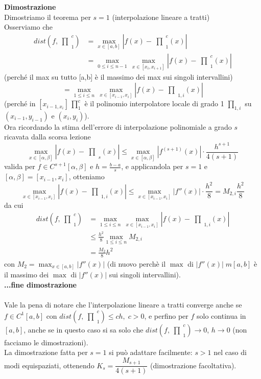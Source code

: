 \documentclass[12pt,a4paper]{article}
\newcommand{\inter}{\begin{matrix}\prod\end{matrix}}
\begin{document}
\textbf{Dimostrazione}\\
Dimostriamo il teorema per $s=1$ (interpolazione lineare a tratti)\\
Osserviamo che
\[ \begin{split}
    dist(f, \inter_{1}^{c}) & = \max_{x \in [a,b]} |f(x) - \inter_{1}^{c} (x) | \\
    & = \max_{0 \le i \le n-1}\, \max_{x \in [x_i, x_{i+1}]} |f(x) - \inter_{1}^{c} (x) |
\end{split} \]
(perché il max su tutto [a,b] è il massimo dei max sui singoli intervallini)
\[= \max_{1 \le i \le n}\, \max_{x \in [x_{i-1},x_i]} |f(x) - \inter_{1,i}^{}(x)|\]
(perché in $[x_{i-1, x_i}] \,\prod_1^c$ è il polinomio interpolatore locale di grado 1 $\prod_{1,i}$ su $(x_{i-1}, y_{i-1})$ e $(x_i, y_i)$).\\
Ora ricordando la stima dell'errore di interpolazione polinomiale a grado $s$ ricavata dalla scorsa lezione
\[\max_{x\in [\alpha , \beta]}|f(x) - \inter_{s}^{}(x)| \le \max_{x\in [\alpha , \beta]}|f^{(s+1)}(x)|\cdot\frac{h^{s+1}}{4(s+1)} \]
valida per $f \in C^{s+1}[\alpha, \beta]$ e $h = \frac{b-a}{s}$, e applicandola per $s=1$ e $[\alpha,\beta] = [x_{i-1},x_i]$, otteniamo
\[\max_{x\in [x_{i-1},x_i]}|f(x) - \inter_{1,i}^{}(x)| \le \max_{x\in [x_{i-1},x_i]}|f''(x)|\cdot\frac{h^2}{8} = M_{2,i} \frac{h^2}{8} \]
da cui
\[ \begin{split}
    dist(f, \inter_{1}^{c}) & = \max_{1 \le i \le n}\, \max_{x \in [x_{i-1},x_i]} |f(x) - \inter_{1,i}^{}(x)| \\
    & \le \frac{h^2}{8} \max_{1 \le i \le n} M_{2,i} \\
    & = \frac{M_2}{8}h^2
\end{split} \]
con $M_2 = \max_{x\in[a,b]} |f''(x)|$ (di nuovo perchè il $\max$ di $|f''(x)| \; m[a,b]$ è il massimo dei $\max$ di $|f''(x)|$ sui singoli intervallini).\\
\textbf{...fine dimostrazione}\\\\
Vale la pena di notare che l'interpolazione lineare a tratti converge anche se $f \in C^1[a,b]$ con $dist(f,\inter_1^c)\leq ch, \; c>0$, e perfino per $f$ solo continua in $[a,b]$, anche se in questo caso si sa solo che $dist(f,\inter_1^c) \rightarrow 0$, $h \rightarrow 0$ (non facciamo le dimostrazioni).\\
La dimostrazione fatta per $s=1$ si può adattare facilmente: $s>1$ nel caso di modi equispaziati, ottenendo $K_s=\dfrac{M_{s+1}}{4(s+1)}$ (dimostrazione facoltativa).\\
\end{document}
